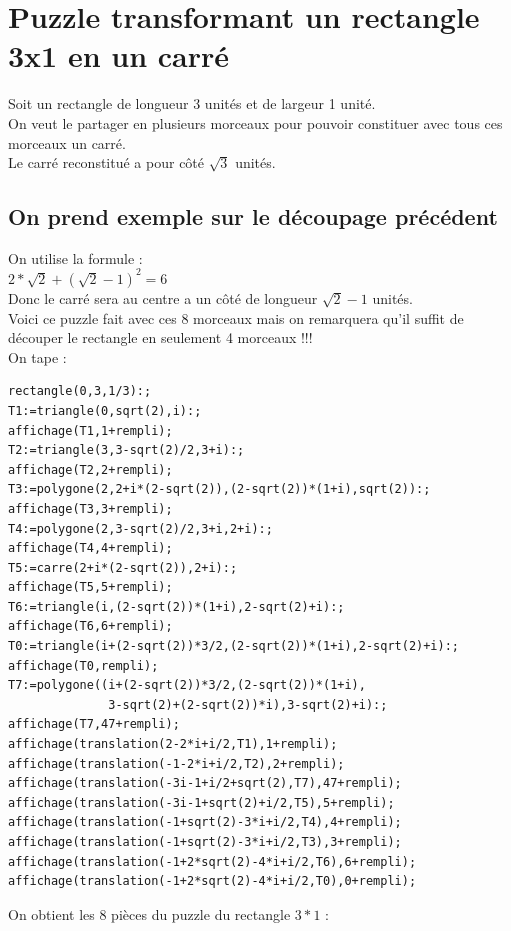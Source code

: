 \documentclass[a4paper,11pt]{book}
\begin{document}
\section{Puzzle transformant un rectangle 3x1 en un carr\'e}
Soit un rectangle de longueur 3 unit\'es et de largeur 1 unit\'e.\\
On veut le partager en plusieurs morceaux pour pouvoir constituer avec 
tous ces morceaux un carr\'e.\\
Le carr\'e reconstitu\'e a pour c\^ot\'e $\sqrt 3$ unit\'es.\\
\subsection{On prend exemple sur le d\'ecoupage pr\'ec\'edent}
On utilise la formule :\\
$2*\sqrt 2+(\sqrt 2-1)^2=6$\\
Donc le carr\'e sera au centre a un c\^ot\'e de longueur $\sqrt 2-1$ unit\'es.\\
Voici ce puzzle fait avec ces 8 morceaux mais on remarquera qu'il suffit de 
d\'ecouper le rectangle en seulement 4 morceaux !!!\\
On tape :
\begin{verbatim}
rectangle(0,3,1/3):;
T1:=triangle(0,sqrt(2),i):; 
affichage(T1,1+rempli);
T2:=triangle(3,3-sqrt(2)/2,3+i):; 
affichage(T2,2+rempli);
T3:=polygone(2,2+i*(2-sqrt(2)),(2-sqrt(2))*(1+i),sqrt(2)):; 
affichage(T3,3+rempli);
T4:=polygone(2,3-sqrt(2)/2,3+i,2+i):; 
affichage(T4,4+rempli);
T5:=carre(2+i*(2-sqrt(2)),2+i):; 
affichage(T5,5+rempli);
T6:=triangle(i,(2-sqrt(2))*(1+i),2-sqrt(2)+i):; 
affichage(T6,6+rempli);
T0:=triangle(i+(2-sqrt(2))*3/2,(2-sqrt(2))*(1+i),2-sqrt(2)+i):; 
affichage(T0,rempli);
T7:=polygone((i+(2-sqrt(2))*3/2,(2-sqrt(2))*(1+i),
              3-sqrt(2)+(2-sqrt(2))*i),3-sqrt(2)+i):; 
affichage(T7,47+rempli);
affichage(translation(2-2*i+i/2,T1),1+rempli);
affichage(translation(-1-2*i+i/2,T2),2+rempli);
affichage(translation(-3i-1+i/2+sqrt(2),T7),47+rempli);
affichage(translation(-3i-1+sqrt(2)+i/2,T5),5+rempli);
affichage(translation(-1+sqrt(2)-3*i+i/2,T4),4+rempli);
affichage(translation(-1+sqrt(2)-3*i+i/2,T3),3+rempli);
affichage(translation(-1+2*sqrt(2)-4*i+i/2,T6),6+rempli);
affichage(translation(-1+2*sqrt(2)-4*i+i/2,T0),0+rempli);
\end{verbatim}
On obtient les 8 pi\`eces du puzzle du rectangle $3*1$ :\\
\end{document}
